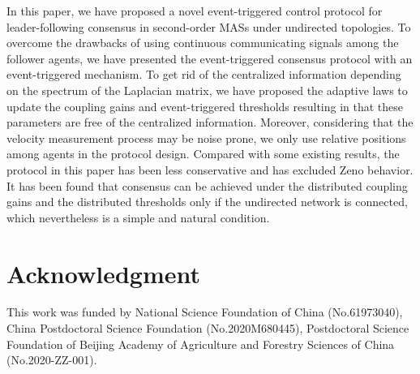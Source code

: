 \documentclass[review]{elsarticle}
\begin{document}
In this paper, we have proposed a novel event-triggered control protocol for leader-following consensus in second-order MASs under undirected topologies. 
To overcome the drawbacks of using continuous communicating signals among the follower agents, we have presented the event-triggered consensus protocol with an event-triggered mechanism. 
To get rid of the centralized information depending on the spectrum of the Laplacian matrix, we have proposed the adaptive laws to update the coupling gains and event-triggered thresholds resulting in that these parameters are free of the centralized information.
Moreover, considering that the velocity measurement process may be noise prone, we only use relative positions among agents in the protocol design. 
Compared with some existing results, the protocol in this paper has been less conservative and has excluded Zeno behavior. It has been found that consensus can be achieved under the distributed coupling gains and the distributed thresholds only if the undirected network is connected, which nevertheless is a simple and natural condition.

\section*{Acknowledgment}
This work was funded by National Science Foundation of China (No.61973040), China Postdoctoral Science Foundation (No.2020M680445), Postdoctoral Science Foundation of Beijing Academy of Agriculture and Forestry Sciences of China (No.2020-ZZ-001).



\end{document}
